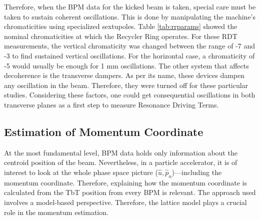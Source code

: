 Therefore, when the BPM data for the kicked beam is taken, special care must be taken to sustain coherent oscillations. This is done by manipulating the machine's chromaticities using specialized sextupoles. Table \ref{tab:rrparams} showed the nominal chromaticities at which the Recycler Ring operates. For these RDT measurements, the vertical chromaticity was changed between the range of -7 and -3 to find sustained vertical oscillations. For the horizontal case, a chromaticity of -5 would usually be enough for 1 mm oscillations. The other system that affects decoherence is the transverse dampers. As per its name, these devices dampen any oscillation in the beam. Therefore, they were turned off for these particular studies. Considering these factors, one could get consequential oscillations in both transverse planes as a first step to measure Resonance Driving Terms.      

\subsection{Estimation of Momentum Coordinate}

At the most fundamental level, BPM data holds only information about the centroid position of the beam. Nevertheless, in a particle accelerator, it is of interest to look at the whole phase space picture ($\hat{u},\hat{p}_u$)---including the momentum coordinate. Therefore, explaining how the momentum coordinate is calculated from the TbT position from every BPM is relevant. The approach used involves a model-based perspective. Therefore, the lattice model plays a crucial role in the momentum estimation.    

